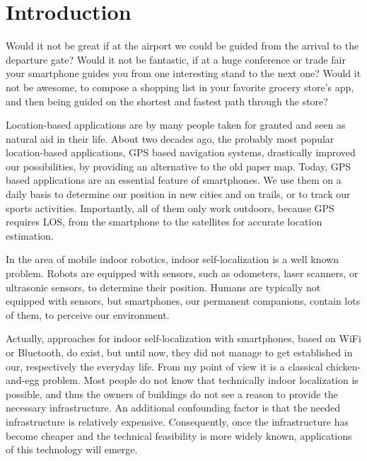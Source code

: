 \chapter{Introduction} \label{chap:intro}

Would it not be great if at the airport we could be guided from the arrival to the departure gate? Would it not be fantastic, if at a huge conference or trade fair your smartphone guides you from one interesting stand to the next one? Would it not be awesome, to compose a shopping list in your favorite grocery store's app, and then being guided on the shortest and fastest path through the store?

Location-based applications are by many people taken for granted and seen as natural aid in their life. About two decades ago, the probably most popular location-based applications, \ac{GPS} based navigation systems, drastically improved our possibilities, by providing an alternative to the old paper map. Today, \ac{GPS} based applications are an essential feature of smartphones. We use them on a daily basis to determine our position in new cities and on trails, or to track our sports activities. Importantly, all of them only work outdoors, because \ac{GPS} requires \ac{LOS}, from the smartphone to the satellites for accurate location estimation.

In the area of mobile indoor robotics, indoor self-localization is a well known problem. Robots are equipped with sensors, such as odometers, laser scanners, or ultrasonic sensors, to determine their position. Humans are typically not equipped with sensors, but smartphones, our permanent companions, contain lots of them, to perceive our environment.

Actually, approaches for indoor self-localization with smartphones, based on WiFi or Bluetooth, do exist, but until now, they did not manage to get established in our, respectively the everyday life. From my point of view it is a classical chicken-and-egg problem. Most people do not know that technically indoor localization is possible, and thus the owners of buildings do not see a reason to provide the necessary infrastructure. An additional confounding factor is that the needed infrastructure is relatively expensive. Consequently, once the infrastructure has become cheaper and the technical feasibility is more widely known, applications of this technology will emerge.

